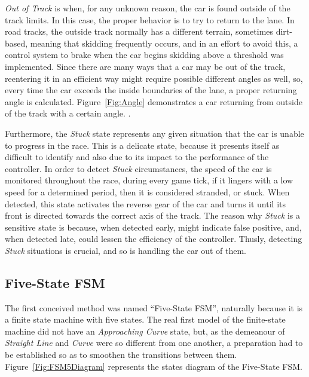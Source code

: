	\emph{Out of Track} is when, for any unknown reason, the car is found outside of the track limits. In this case, the proper behavior is to try to return to the lane. In road tracks, the outside track normally has a different terrain, sometimes dirt-based, meaning that skidding frequently occurs, and in an effort to avoid this, a control system to brake when the car begins skidding above a threshold was implemented. Since there are many ways that a car may be out of the track, reentering it in an efficient way might require possible different angles as well, so, every time the car exceeds the inside boundaries of the lane, a proper returning angle is calculated. Figure~\ref{Fig:Angle} demonstrates a car returning from outside of the track with a certain angle. .
	
	Furthermore, the \emph{Stuck} state represents any given situation that the car is unable to progress in the race. This is a delicate state, because it presents itself as difficult to identify and also due to its impact to the performance of the controller. In order to detect \emph{Stuck} circumstances, the speed of the car is monitored throughout the race, during every game tick, if it lingers with a low speed for a determined period, then it is considered stranded, or stuck. When detected, this state activates the reverse gear of the car and turns it until its front is directed towards the correct axis of the track. The reason why \emph{Stuck} is a sensitive state is because, when detected early, might indicate false positive, and, when detected late, could lessen the efficiency of the controller. Thusly, detecting \textit{Stuck} situations is crucial, and so is handling the car out of them.
	
\subsection{Five-State FSM} \label{subsec:FSM5}

	The first conceived method was named ``Five-State FSM'', naturally because it is a finite state machine with five states. The real first model of the finite-state machine did not have an \emph{Approaching Curve} state, but, as the demeanour of \emph{Straight Line} and \emph{Curve} were so different from one another, a preparation had to be established so as to smoothen the transitions between them. Figure~\ref{Fig:FSM5Diagram} represents the states diagram of the Five-State FSM.
	
